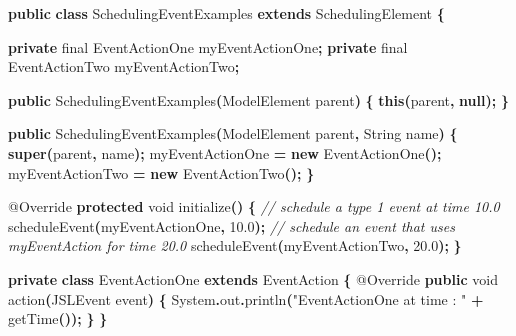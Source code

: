 \documentclass[
]{book}
\newenvironment{Shaded}{\begin{snugshade}}{\end{snugshade}}
\newcommand{\AttributeTok}[1]{\textcolor[rgb]{0.77,0.63,0.00}{#1}}
\newcommand{\BuiltInTok}[1]{#1}
\newcommand{\CommentTok}[1]{\textcolor[rgb]{0.56,0.35,0.01}{\textit{#1}}}
\newcommand{\DataTypeTok}[1]{\textcolor[rgb]{0.13,0.29,0.53}{#1}}
\newcommand{\FloatTok}[1]{\textcolor[rgb]{0.00,0.00,0.81}{#1}}
\newcommand{\FunctionTok}[1]{\textcolor[rgb]{0.00,0.00,0.00}{#1}}
\newcommand{\KeywordTok}[1]{\textcolor[rgb]{0.13,0.29,0.53}{\textbf{#1}}}
\newcommand{\NormalTok}[1]{#1}
\newcommand{\OperatorTok}[1]{\textcolor[rgb]{0.81,0.36,0.00}{\textbf{#1}}}
\newcommand{\StringTok}[1]{\textcolor[rgb]{0.31,0.60,0.02}{#1}}
\theoremstyle{definition}
\theoremstyle{definition}
\theoremstyle{definition}
\theoremstyle{definition}
\theoremstyle{remark}
\begin{document}
\begin{Shaded}
\begin{Highlighting}[]
\KeywordTok{public} \KeywordTok{class}\NormalTok{ SchedulingEventExamples }\KeywordTok{extends}\NormalTok{ SchedulingElement }\OperatorTok{\{}

    \KeywordTok{private} \DataTypeTok{final}\NormalTok{ EventActionOne myEventActionOne}\OperatorTok{;}
    \KeywordTok{private} \DataTypeTok{final}\NormalTok{ EventActionTwo myEventActionTwo}\OperatorTok{;}

    \KeywordTok{public} \FunctionTok{SchedulingEventExamples}\OperatorTok{(}\NormalTok{ModelElement parent}\OperatorTok{)} \OperatorTok{\{}
        \KeywordTok{this}\OperatorTok{(}\NormalTok{parent}\OperatorTok{,} \KeywordTok{null}\OperatorTok{);}
    \OperatorTok{\}}

    \KeywordTok{public} \FunctionTok{SchedulingEventExamples}\OperatorTok{(}\NormalTok{ModelElement parent}\OperatorTok{,} \BuiltInTok{String}\NormalTok{ name}\OperatorTok{)} \OperatorTok{\{}
        \KeywordTok{super}\OperatorTok{(}\NormalTok{parent}\OperatorTok{,}\NormalTok{ name}\OperatorTok{);}
\NormalTok{        myEventActionOne }\OperatorTok{=} \KeywordTok{new} \FunctionTok{EventActionOne}\OperatorTok{();}
\NormalTok{        myEventActionTwo }\OperatorTok{=} \KeywordTok{new} \FunctionTok{EventActionTwo}\OperatorTok{();}
    \OperatorTok{\}}

    \AttributeTok{@Override}
    \KeywordTok{protected} \DataTypeTok{void} \FunctionTok{initialize}\OperatorTok{()} \OperatorTok{\{}
        \CommentTok{// schedule a type 1 event at time 10.0}
        \FunctionTok{scheduleEvent}\OperatorTok{(}\NormalTok{myEventActionOne}\OperatorTok{,} \FloatTok{10.0}\OperatorTok{);}
        \CommentTok{// schedule an event that uses myEventAction for time 20.0}
        \FunctionTok{scheduleEvent}\OperatorTok{(}\NormalTok{myEventActionTwo}\OperatorTok{,} \FloatTok{20.0}\OperatorTok{);}
    \OperatorTok{\}}

    \KeywordTok{private} \KeywordTok{class}\NormalTok{ EventActionOne }\KeywordTok{extends}\NormalTok{ EventAction }\OperatorTok{\{}
        \AttributeTok{@Override}
        \KeywordTok{public} \DataTypeTok{void} \FunctionTok{action}\OperatorTok{(}\NormalTok{JSLEvent event}\OperatorTok{)} \OperatorTok{\{}
            \BuiltInTok{System}\OperatorTok{.}\FunctionTok{out}\OperatorTok{.}\FunctionTok{println}\OperatorTok{(}\StringTok{"EventActionOne at time : "} \OperatorTok{+} \FunctionTok{getTime}\OperatorTok{());}
        \OperatorTok{\}}
    \OperatorTok{\}}


\end{Highlighting}
\end{Shaded}
\end{document}

